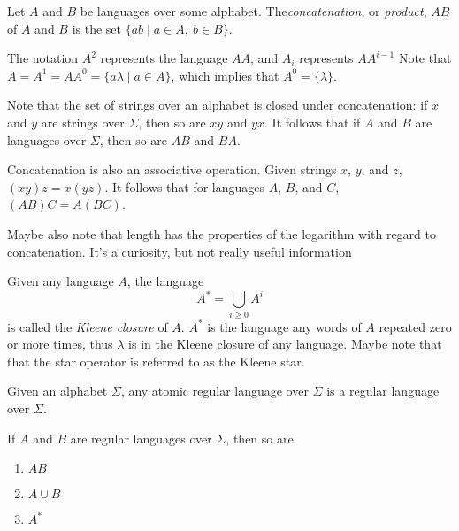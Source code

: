 \documentclass{bcthesis}
\renewcommand{\meo}{}
\newcommand{\footcite}[2]{\footnote{\cite[pg.~{#2}]{#1}}}
\renewcommand{\footcite}[2]{\cite[pg.~{#2}]{#1}}
\begin{document}
	\begin{definition}
		Let $A$ and $B$ be languages over some alphabet.
		The\textit{concatenation}, or \textit{product}, $AB$ of $A$ and $B$ is the set $\{ ab \mid a \in A, \ b \in B \}$.\footcite{lemmings}{3}

		The notation $A^2$ represents the language $AA$, and $A_i$ represents $AA^{i-1}$
		Note that $A = A^1 = AA^0 = \{ a \lambda \mid a \in A \}$, which implies that $A^0 = \{ \lambda \}$.\footcite{lemmings}{3}
	\end{definition}

	\begin{remark}
		Note that the set of strings over an alphabet is closed under concatenation: if $x$ and $y$ are strings over $\Sigma$, then so are $xy$ and $yx$.
		It follows that if $A$ and $B$ are languages over $\Sigma$, then so are $AB$ and $BA$.\footcite{lemmings}{2}
		
		Concatenation is also an associative operation.
		Given strings $x$, $y$, and $z$, $(xy)z = x(yz)$.
		It follows that for languages $A$, $B$, and $C$, $(AB)C = A(BC)$.\footcite{lemmings}{2}

		\meo{
			Maybe also note that length has the properties of the logarithm with regard to concatenation.
			It's a curiosity, but not really useful information
		}
	\end{remark}

	\begin{definition}
		Given any language $A$, the language 
		\[
			A^* = \bigcup_{i \geq 0} A^i
		\]
		is called the \textit{Kleene closure} of $A$.
		$A^*$ is the language any words of $A$ repeated zero or more times, thus $\lambda$ is in the Kleene closure of any language.\footcite{lemmings}{3}
		\meo{Maybe note that that the star operator is referred to as the Kleene star.}
	\end{definition}

	\begin{definition}
		Given an alphabet $\Sigma$, any atomic regular language over $\Sigma$ is a regular language over $\Sigma$.
		
		If $A$ and $B$ are regular languages over $\Sigma$, then so are 
		\begin{enumerate}[label=(\roman*), itemsep = -0.3 ex, nolistsep]
			\item $AB$
			\item $A \cup B$
			\item $A^*$
		\end{enumerate}
		\footcite{rosen}{879}
	\end{definition}
\end{document}
